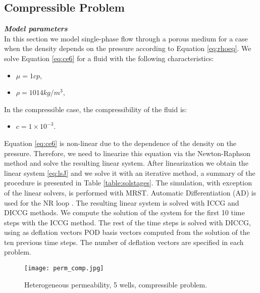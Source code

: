 \documentclass[12pt]{article}
\numberwithin{equation}{section}
\begin{document}
\newpage
\newpage
\subsection{Compressible Problem}
\emph{\textbf{Model parameters}}\\

In this section we model single-phase flow through a porous medium for a case when the density depends on the pressure 
according to Equation \ref{eq:rhoeq}. We solve Equation \eqref{eq:ce6} for a fluid with the following characteristics:
\begin{itemize}
 \item $\mu = 1 cp$,
 \item $\rho = 1014 kg/m^3$,
\end{itemize}
In the compressible case, the compressibility of the fluid is:
\begin{itemize}
 \item $c= 1 \times 10^{-3}$.
\end{itemize}
Equation \eqref{eq:ce6} is non-linear due to the dependence of the density on the pressure. Therefore, we need to 
linearize this equation via the Newton-Raphson method and solve the resulting linear system. After linearization we obtain the linear system \eqref{eq:lsJ} and we solve it with an iterative method, a summary of the procedure is presented in Table \ref{table:solstages}. The simulation, with exception of the linear solvers, is performed with MRST. Automatic Differentiation (AD) is used for the NR loop \cite{Lie13}. The resulting linear system is solved with ICCG and DICCG methods. We compute the solution of the system for the first 10 time steps with the ICCG method. The rest of the time steps is solved with DICCG, using as deflation vectors POD basis vectors computed from the solution of the ten previous time steps. The number of deflation vectors are specified in each problem. \\
\begin{wrapfigure}{R}{5cm}
\centering 
\vspace{-20pt}
\texttt{[image: perm\_comp.jpg]}
 \vspace{-15pt}
\caption{ Heterogeneous permeability, 5 wells, compressible problem.}\label{fig:pc}
\vspace{-10pt}
\end{wrapfigure} 
\end{document}
